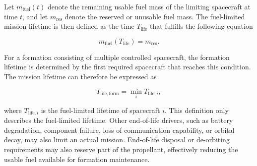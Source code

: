 Let $m_{\mathrm{fuel}}(t)$ denote the remaining usable fuel mass of the limiting spacecraft at time $t$, and let $m_{\mathrm{res}}$ denote the reserved or unusable fuel mass. The fuel-limited mission lifetime is then defined as the time $T_\mathrm{life}$ that fulfills the following equation

\begin{equation}
m_{\mathrm{fuel}}(T_{\mathrm{life}}) = m_{\mathrm{res}}.
\end{equation}

For a formation consisting of multiple controlled spacecraft, the formation lifetime is determined by the first required spacecraft that reaches this condition. The mission lifetime can therefore be expressed as

\begin{equation}
    T_{\mathrm{life,form}}
    =
    \min_i T_{\mathrm{life},i},
\end{equation}

where $T_{\mathrm{life},i}$ is the fuel-limited lifetime of spacecraft $i$. This definition only describes the fuel-limited lifetime. Other end-of-life drivers, such as battery degradation, component failure, loss of communication capability, or orbital decay, may also limit an actual mission. End-of-life disposal or de-orbiting requirements may also reserve part of the propellant, effectively reducing the usable fuel available for formation maintenance.


